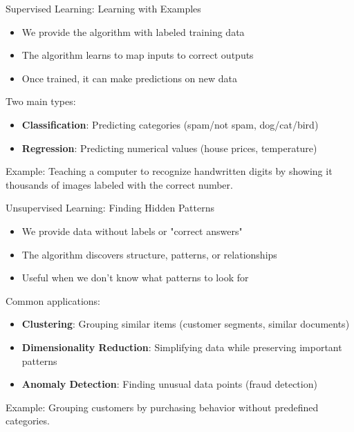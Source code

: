\documentclass{beamer}
\begin{document}
\begin{frame}{Supervised Learning: Learning with Examples}
  \begin{itemize}
    \item We provide the algorithm with labeled training data
    \item The algorithm learns to map inputs to correct outputs
    \item Once trained, it can make predictions on new data
  \end{itemize}
  
  \vspace{0.3cm}
  Two main types:
  \begin{itemize}
    \item \textbf{Classification}: Predicting categories (spam/not spam, dog/cat/bird)
    \item \textbf{Regression}: Predicting numerical values (house prices, temperature)
  \end{itemize}
  
  \vspace{0.3cm}
  Example: Teaching a computer to recognize handwritten digits by showing it thousands of images labeled with the correct number.
\end{frame}

\begin{frame}{Unsupervised Learning: Finding Hidden Patterns}
  \begin{itemize}
    \item We provide data without labels or "correct answers"
    \item The algorithm discovers structure, patterns, or relationships
    \item Useful when we don't know what patterns to look for
  \end{itemize}
  
  \vspace{0.3cm}
  Common applications:
  \begin{itemize}
    \item \textbf{Clustering}: Grouping similar items (customer segments, similar documents)
    \item \textbf{Dimensionality Reduction}: Simplifying data while preserving important patterns
    \item \textbf{Anomaly Detection}: Finding unusual data points (fraud detection)
  \end{itemize}
  
  \vspace{0.3cm}
  Example: Grouping customers by purchasing behavior without predefined categories.
\end{frame}
\end{document}
